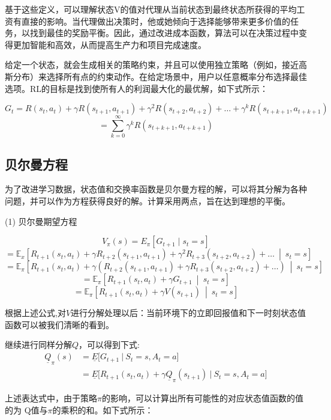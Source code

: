 基于这些定义，可以理解状态V的值对代理从当前状态到最终状态所获得的平均工资有直接的影响。当代理做出决策时，他或她倾向于选择能够带来更多价值的任务，以找到最佳的奖励平衡。因此，通过改进成本函数，算法可以在决策过程中变得更加智能和高效，从而提高生产力和项目完成速度。

给定一个状态，就会生成相关的策略约束，并且可以使用独立策略（例如，接近高斯分布）来选择所有点的约束动作。在给定场景中，用户以任意概率分布选择最佳选项。RL的目标是找到使所有人的利润最大化的最优解，如下式所示：

\[
G_t = R(s_t, a_t) + \gamma R(s_{t+1}, a_{t+1}) + \gamma^2 R(s_{t+2}, a_{t+2}) + \ldots + \gamma^k R(s_{t+k+1}, a_{t+k+1})
\]
\[
= \sum_{k=0}^\infty \gamma^k R(s_{t+k+1}, a_{t+k+1})
\]

\subsection{贝尔曼方程}

为了改进学习数据，状态值和交换率函数是贝尔曼方程的解，可以将其分解为各种问题，并可以作为方程获得良好的解\cite{franccois2018introduction}。计算采用两点，旨在达到理想的平衡。

(1) 贝尔曼期望方程

\[
V_{\pi}(s) = E_{\pi} \left[ G_{t+1} \mid s_{t} = s \right]
\]
\[
= \mathbb{E}_x \left[ R_{t+1}(s_t, a_t) + \gamma R_{t+2}(s_{t+1}, a_{t+1}) + \gamma^2 R_{t+3}(s_{t+2}, a_{t+2}) + \ldots \ \middle| \ s_t = s \right]
\]
\[
= \mathbb{E}_{\pi} \left[ R_{t+1}(s_t, a_t) + \gamma \left( R_{t+2}(s_{t+1}, a_{t+1}) + \gamma R_{t+3}(s_{t+2}, a_{t+2}) + \ldots \right) \ \middle| \ s_t = s \right]
\]
\[
= \mathbb{E}_{\pi} \left[ R_{t+1}(s_t, a_t) + \gamma G_{t+1} \ \middle| \ s_t = s \right]
\]
\[
= \mathbb{E}_{\pi} \left[ R_{t+1}(s_t, a_t) + \gamma V(s_{t+1}) \ \middle| \ s_t = s \right]
\]

根据上述公式,对${V}$进行分解处理以后：当前环境下的立即回报值和下一时刻状态值函数可以被我们清晰的看到。

继续进行同样分解${Q}$，可以得到下式:
\begin{align*}
	\underline{Q}_\pi(s) &= \underline{E} \Big[ G_{t+1} \ \Big| \ S_t = s, A_t = a \Big] \\
	&= \underline{E} \Big[ R_{t+1}(s_t, a_t) + \gamma \underline{Q}_\pi(s_{t+1}) \ \Big| \ S_t = s, A_t = a \Big]
\end{align*}

上述表达式中，由于策略$\pi$的影响，可以计算出所有可能性的对应状态值函数的值的为
Q值与$\pi$的乘积的和。如下式所示：

